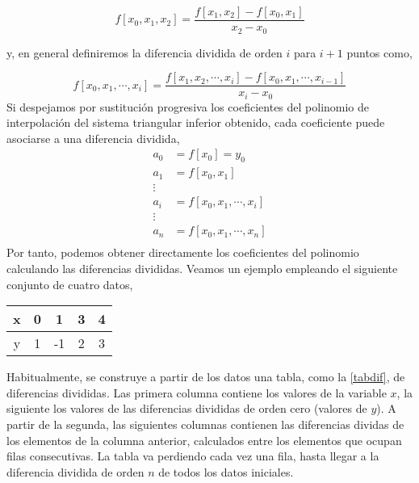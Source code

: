 \begin{equation*}
f\left[x_0,x_1,x_2\right]=\frac{f\left[x_1,x_2\right]-f\left[x_0,x_1\right]}{x_2-x_0}
\end{equation*}

y, en general definiremos la diferencia dividida de orden $i$ para $i+1$ puntos como,

\begin{equation*}
f\left[x_0,x_1,\cdots,x_i\right]=\frac{f\left[x_1,x_2,\cdots,x_i\right]-f\left[x_0,x_1,\cdots,x_{i-1}\right]}{x_i-x_0}
\end{equation*}																																	Si despejamos por sustitución progresiva los coeficientes del polinomio de interpolación del sistema triangular inferior obtenido, cada coeficiente puede asociarse a una diferencia dividida,
\begin{align*}
a_0&=f\left[x_0\right]=y_0\\
a_1&=f\left[x_0,x_1\right]\\
\vdots\\
a_i&=f\left[x_0,x_1,\cdots,x_i\right]\\
\vdots\\
a_n&=f\left[x_0,x_1,\cdots,x_n\right]\\
\end{align*}																								
Por tanto, podemos obtener directamente los coeficientes del polinomio calculando las diferencias divididas. Veamos un ejemplo empleando el siguiente conjunto de cuatro datos,

\begin{table}[h]
\centering
\begin{tabular}{c|cccc}
x&0&1&3&4\\
\hline
y&1&-1&2&3
\end{tabular}
\end{table}

Habitualmente, se construye a partir de los datos una tabla, como la  \ref{tabdif}, de diferencias divididas. Las primera columna contiene los valores de la variable $x$, la siguiente los valores de las diferencias divididas de orden cero (valores de $y$). A partir de la segunda, las siguientes columnas contienen las diferencias dividas de los elementos de la columna anterior, calculados entre los elementos que ocupan filas consecutivas. La tabla va perdiendo cada vez una fila, hasta llegar a la diferencia dividida de orden $n$ de todos los datos iniciales.

